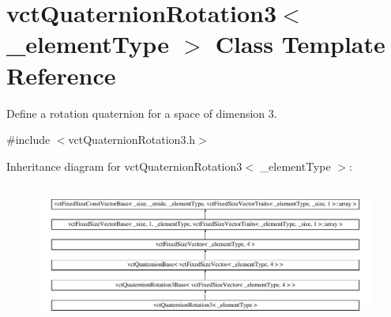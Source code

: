 \hypertarget{classvct_quaternion_rotation3}{\section{vct\-Quaternion\-Rotation3$<$ \-\_\-element\-Type $>$ Class Template Reference}
\label{classvct_quaternion_rotation3}
}


Define a rotation quaternion for a space of dimension 3.  




{\ttfamily \#include $<$vct\-Quaternion\-Rotation3.\-h$>$}

Inheritance diagram for vct\-Quaternion\-Rotation3$<$ \-\_\-element\-Type $>$\-:\begin{figure}[H]
\begin{center}
\leavevmode
\includegraphics[height=4.666667cm]{d8/da7/classvct_quaternion_rotation3}
\end{center}
\end{figure}
